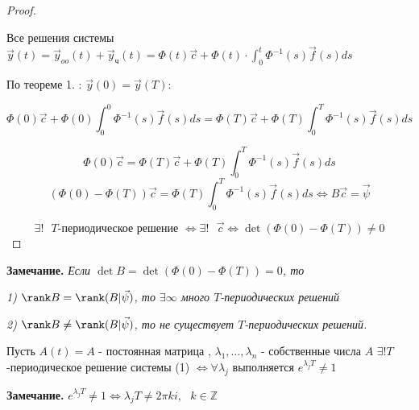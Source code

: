 \documentclass[12pt, a4paper]{report}
\begin{document}
\begin{proof}
    \begin{flushleft}
        Все решения системы \( \displaystyle  \vec{y }  (t) = \vec{ y } _{oo} (t )+ \vec{y } _{\text{ч} }(t ) = \Phi(t ) \vec{c }  + \Phi(t ) \cdot \int_{0}^{t }  \Phi^{-1 } (s ) \vec{f } (s )ds   \) 
    \end{flushleft}

    По теореме 1. : \( \vec{y } (0) = \vec{y } (T )  \):

    \[\Phi(0 ) \vec{c }  + \Phi(0 ) \int_{0 }^{0 } \Phi^{-1 } (s ) \vec{f } (s ) ds = \Phi(T ) \vec{c }  +\Phi(T ) \int_{0}^{T } \Phi^{-1 }  (s) \vec{f } (s ) ds  \] 

    \[\Phi ( 0) \vec{c } = \Phi (T ) \vec{c }  + \Phi (T ) \int_{0 }^{T }  \Phi^{-1 }  (s ) \vec{f } (s ) ds   \] 
    \[ (\Phi(0 )- \Phi(T ))\vec{c }  = \Phi(T ) \int_{0 }^{T } \Phi^{-1 } (s )\vec{f } (s )ds \Leftrightarrow  B \vec{c }  = \vec{\psi}  \]  

    \[ \exists ! \text{ } T\text{-периодическое решение  } \Leftrightarrow \exists ! \text{ }  \vec{c }  \Leftrightarrow  \det  (\Phi(0 )- \Phi(T )) \neq 0  \] 
\end{proof}

\begin{flushleft}
    \textbf{Замечание. } \textit{Если \( \det  B = \det  (\Phi(0 )- \Phi(T ))  = 0\), то}
    
    \textit{1) \( \rank B  = \rank  (B|\vec{\psi} ) \), то \( \exists \infty   \)  много \( T \)-периодических решений } 
    
    \textit{2) \( \rank B \neq  \rank (B|\vec{\psi} ) \), то не существует \( T \)-периодических решений. } 
\end{flushleft}

\begin{theorem}
    Пусть \(  A(t ) = A\) - постоянная матрица , \( \lambda_1, \ldots, \lambda_n \) - собственные числа \( A  \) \( \exists ! T \)-периодическое решение системы (1) \( \Leftrightarrow  \forall  \lambda_j \) выполняется \( e^{\lambda_j T } \neq 1  \) 
\end{theorem}

\begin{flushleft}
    \textbf{Замечание. } \textit{ \( e^{ \lambda_j T } \neq 1 \Leftrightarrow  \lambda_j T \neq 2 \pi k i , \text{ } k \in  \mathbb{Z} \) }  
\end{flushleft}
\end{document}
